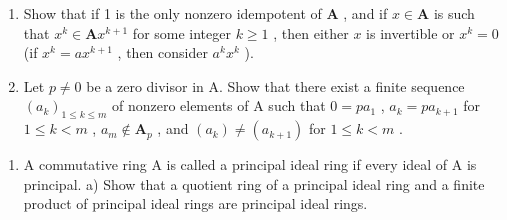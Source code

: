 \begin{enumerate}
\def\labelenumi{\alph{enumi})}
\setcounter{enumi}{2}
\item
  Show that if 1 is the only nonzero idempotent of \(\mathbf{A}\) , and if \(x \in \mathbf{A}\) is such that \(x^k \in \mathbf{A}x^{k+1}\) for some integer \(k \geqslant 1\) , then either \(x\) is invertible or \(x^k = 0\) (if \(x^k = ax^{k+1}\) , then consider \(a^k x^k\) ).
\item
  Let \(p \neq 0\) be a zero divisor in A. Show that there exist a finite sequence \((a_k)_{1 \leqslant k \leqslant m}\) of nonzero elements of A such that \(0 = pa_1\) , \(a_k = pa_{k+1}\) for \(1 \leqslant k < m\) , \(a_m \notin \mathbf{A}_p\) , and \((a_k) \neq (a_{k+1})\) for \(1 \leqslant k < m\) .
\end{enumerate}

\begin{enumerate}
\def\labelenumi{\arabic{enumi})}
\setcounter{enumi}{5}
\tightlist
\item
  A commutative ring A is called a principal ideal ring if every ideal of A is principal. a) Show that a quotient ring of a principal ideal ring and a finite product of principal ideal rings are principal ideal rings.
\end{enumerate}

